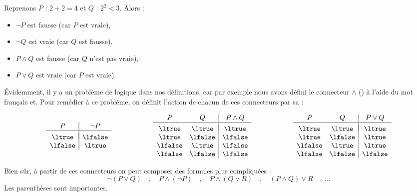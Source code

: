 \documentclass[11pt,class=report,crop=false]{standalone}
\begin{document}
Reprenons $P$ : \og{}$2+2 = 4$\fg{} et $Q$ : \og{}$2^2 < 3$\fg{}.
Alors : 
\begin{itemize}
	\item $\lnot P$ est fausse (car $P$ est vraie),
	\item $\lnot Q$ est vraie (car $Q$ est fausse),	
	\item $P \land Q$ est fausse (car $Q$ n'est pas vraie),
	\item $P \lor Q$ est vraie (car $P$ est vraie).
\end{itemize}

Évidemment, il y a un problème de logique dans nos définitions, car par exemple nous avons défini le connecteur \og{}$\land$ \fg{} (\tand) à l'aide du mot français \og{}et\fg{}. Pour remédier à ce problème, on définit l'action de chacun de ces connecteurs par sa  :

\[
\begin{array}{c | c}
P		& \lnot P \\
\hline
&	\\[-2ex]
\ltrue 	& \lfalse \\
\lfalse & \ltrue \\
\end{array}
\qquad\qquad\qquad
\begin{array}{c c | c}
	P		& Q 		& P \land Q \\
	\hline
	&&	\\[-2ex]
	\ltrue 	& \ltrue 	& \ltrue \\
	\ltrue 	& \lfalse 	& \lfalse \\
	\lfalse & \ltrue 	& \lfalse \\	
	\lfalse & \lfalse 	& \lfalse \\		
\end{array}
\qquad\qquad\qquad
\begin{array}{c c | c}
	P		& Q 		& P \lor Q \\
	\hline
	&&	\\[-2ex]
	\ltrue 	& \ltrue 	& \ltrue \\
	\ltrue 	& \lfalse 	& \ltrue \\
	\lfalse & \ltrue 	& \ltrue \\	
	\lfalse & \lfalse 	& \lfalse \\		
\end{array}
\]


Bien sûr, à partir de ces connecteurs on peut composer des formules plus compliquées :
\[
\lnot(P \lor Q)\quad , \quad 
P \land (\lnot P)\quad , \quad 
P \land (Q \lor R)\quad , \quad 
(P \land Q) \lor R\quad , \ \ldots
\]
Les parenthèses sont importantes.
\end{document}
